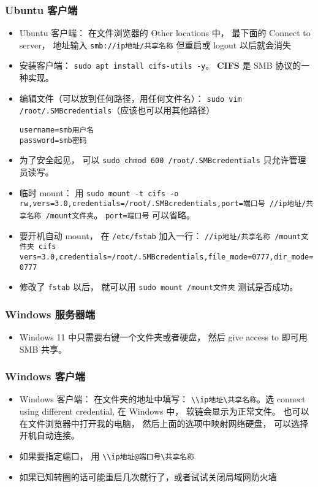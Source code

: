 \subsubsection{Ubuntu 客户端}
\begin{itemize}
\item Ubuntu 客户端： 在文件浏览器的 Other locations 中， 最下面的 Connect to server， 地址输入 \verb`smb://ip地址/共享名称` 但重启或 logout 以后就会消失
\item 安装客户端： \verb`sudo apt install cifs-utils -y`。 \textbf{CIFS} 是 SMB 协议的一种实现。
\item 编辑文件（可以放到任何路径，用任何文件名）： \verb`sudo vim /root/.SMBcredentials`（应该也可以用其他路径）
\begin{lstlisting}[language=none]
username=smb用户名
password=smb密码
\end{lstlisting}
\item 为了安全起见， 可以 \verb`sudo chmod 600 /root/.SMBcredentials` 只允许管理员读写。
\item 临时 mount： 用 \verb`sudo mount -t cifs -o rw,vers=3.0,credentials=/root/.SMBcredentials,port=端口号 //ip地址/共享名称 /mount文件夹`。 \verb`port=端口号` 可以省略。
\item 要开机自动 mount， 在 \verb`/etc/fstab` 加入一行： \verb`//ip地址/共享名称 /mount文件夹 cifs vers=3.0,credentials=/root/.SMBcredentials,file_mode=0777,dir_mode=0777`
\item 修改了 \verb`fstab` 以后， 就可以用 \verb`sudo mount /mount文件夹` 测试是否成功。
\end{itemize}

\subsubsection{Windows 服务器端}
\begin{itemize}
\item Windows 11 中只需要右键一个文件夹或者硬盘， 然后 give access to 即可用 SMB 共享。
\end{itemize}

\subsubsection{Windows 客户端}
\begin{itemize}
\item Windows 客户端： 在文件夹的地址中填写： \verb`\\ip地址\共享名称`。选 connect using different credential, 在 Windows 中， 软链会显示为正常文件。 也可以在文件浏览器中打开我的电脑， 然后上面的选项中映射网络硬盘， 可以选择开机自动连接。
\item 如果要指定端口， 用 \verb`\\ip地址@端口号\共享名称`
\item 如果已知转圈的话可能重启几次就行了，或者试试关闭局域网防火墙
\end{itemize}

